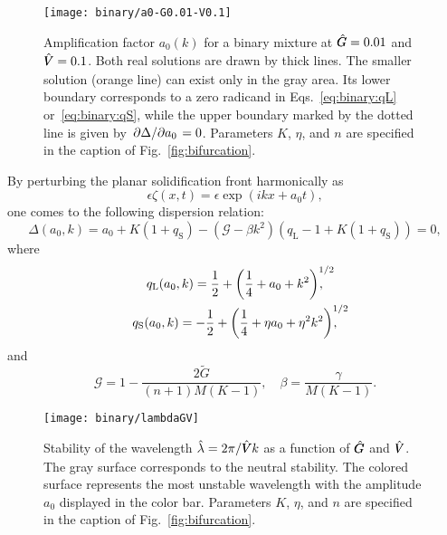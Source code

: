 \documentclass{article}
\newcommand{\liq}{\text{L}}
\newcommand{\sol}{\text{S}}
\newcommand{\qL}{q_\liq}
\newcommand{\qS}{q_\sol}
\newcommand{\hV}[1][\qty(\bar{V})]{\vphantom{#1}\mathrlap{\smash{\hat{V}}}V}
\newcommand{\hG}[1][\qty(\bar{G})]{\vphantom{#1}\mathrlap{\smash{\hat{G}}}G}
\begin{document}
\begin{figure}
    \centering
    \texttt{[image: binary/a0-G0.01-V0.1]}
    \caption{
        Amplification factor $a_0(k)$ for a binary mixture at $\hG=0.01$ and $\hV=0.1$.
        Both real solutions are drawn by thick lines.
        The smaller solution (orange line) can exist only in the gray area.
        Its lower boundary corresponds to a zero radicand in Eqs.~\eqref{eq:binary:qL} or~\eqref{eq:binary:qS},
        while the upper boundary marked by the dotted line is given by $\pdv*{\Delta}{a_0}=0$.
        Parameters $K$, $\eta$, and $n$ are specified in the caption of Fig.~\ref{fig:bifurcation}.
    }\label{fig:binary:a0}
\end{figure}

By perturbing the planar solidification front harmonically as
\begin{equation}\label{eq:binary:perturbation}
    \epsilon\zeta(x,t) = \epsilon\exp(ikx + a_0t),
\end{equation}
one comes to the following dispersion relation:
\begin{equation}\label{eq:binary:a0}
    \Delta(a_0,k) = a_0 + K(1+\qS) - (\mathcal{G}-\beta k^2)(\qL-1 + K(1+\qS)) = 0,
\end{equation}
where
\begin{gather}
    \qL(a_0,k) = \frac12 + \qty(\frac14 + a_0 + k^2)^{\mathrlap{1/2}}, \label{eq:binary:qL}\\
    \qS(a_0,k) = -\frac12 + \qty(\frac14 + \eta a_0 + \eta^2k^2)^{\mathrlap{1/2}}, \label{eq:binary:qS}
\end{gather}
and
\begin{equation}\label{eq:Gbeta}
    \mathcal{G} = 1 - \frac{2\tilde{G}}{(n+1)M(K-1)}, \quad
    \beta = \frac{\gamma}{M(K-1)}.
\end{equation}

\begin{figure}
    \centering
    \vspace{-80pt}
    \texttt{[image: binary/lambdaGV]}
    \caption{
        Stability of the wavelength $\hat\lambda=2\pi/\hV k$ as a function of $\hG$ and $\hV$.
        The gray surface corresponds to the neutral stability.
        The colored surface represents the most unstable wavelength with the amplitude $a_0$ displayed in the color bar.
        Parameters $K$, $\eta$, and $n$ are specified in the caption of Fig.~\ref{fig:bifurcation}.
    }\label{fig:binary:lambdaGV}
\end{figure}
\end{document}
